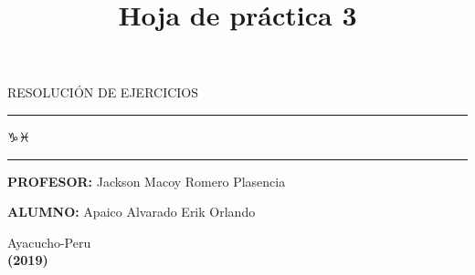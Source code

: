 \documentclass[12pt]{article}
\begin{document}
\begin{titlepage}
\begin{center}
\begin{large}
RESOLUCIÓN DE EJERCICIOS\\

\rule{20mm}{0.1mm}

$\capricornus\pisces$ %

\rule{20mm}{0.1mm}

\end{large}

\vspace*{0.3in}

\vspace*{0.1in}

\end{center}

\begin{flushleft}
{\bf PROFESOR:} Jackson Macoy Romero Plasencia\\
\vspace*{0.2in}

{\bf ALUMNO:} Apaico Alvarado Erik Orlando\\


\end{flushleft}

\begin{center}

\begin{large}

\vspace*{0.50in}

Ayacucho-Peru\\

{\bf (2019)}

\end{large}





\title{Hoja de práctica 3\\
       }


\end{center}
\end{titlepage}
\end{document}
